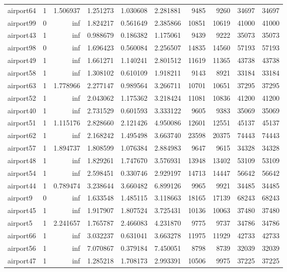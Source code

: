 \begin{longtable}{|l|r|r|r|r|r|r|r|r|r|}
airport64 & 1 & 1.506937 & 1.251273 & 1.030608 & 2.281881 & 9485 & 9260 & 34697 & 34697 \\
airport99 & 0 & inf & 1.824217 & 0.561649 & 2.385866 & 10851 & 10619 & 41000 & 41000 \\
airport43 & 1 & inf & 0.988679 & 0.186382 & 1.175061 & 9439 & 9222 & 35073 & 35073 \\
airport98 & 0 & inf & 1.696423 & 0.560084 & 2.256507 & 14835 & 14560 & 57193 & 57193 \\
airport49 & 1 & inf & 1.661271 & 1.140241 & 2.801512 & 11619 & 11365 & 43738 & 43738 \\
airport58 & 1 & inf & 1.308102 & 0.610109 & 1.918211 & 9143 & 8921 & 33184 & 33184 \\
airport63 & 1 & 1.778966 & 2.277147 & 0.989564 & 3.266711 & 10701 & 10651 & 37295 & 37295 \\
airport52 & 1 & inf & 2.043062 & 1.175362 & 3.218424 & 11081 & 10836 & 41200 & 41200 \\
airport40 & 1 & inf & 2.731529 & 0.601593 & 3.333122 & 9605 & 9383 & 35069 & 35069 \\
airport51 & 1 & 1.115176 & 2.828660 & 2.121426 & 4.950086 & 12601 & 12551 & 45137 & 45137 \\
airport62 & 1 & inf & 2.168242 & 1.495498 & 3.663740 & 23598 & 20375 & 74443 & 74443 \\
airport57 & 1 & 1.894737 & 1.808599 & 1.076384 & 2.884983 & 9647 & 9615 & 34328 & 34328 \\
airport48 & 1 & inf & 1.829261 & 1.747670 & 3.576931 & 13948 & 13402 & 53109 & 53109 \\
airport54 & 1 & inf & 2.598451 & 0.330746 & 2.929197 & 14713 & 14447 & 56642 & 56642 \\
airport44 & 1 & 0.789474 & 3.238644 & 3.660482 & 6.899126 & 9965 & 9921 & 34485 & 34485 \\
airport9 & 0 & inf & 1.633548 & 1.485115 & 3.118663 & 18165 & 17139 & 68243 & 68243 \\
airport45 & 1 & inf & 1.917907 & 1.807524 & 3.725431 & 10136 & 10063 & 37480 & 37480 \\
airport5 & 1 & 2.241657 & 1.765787 & 2.466083 & 4.231870 & 9775 & 9737 & 34786 & 34786 \\
airport66 & 1 & inf & 3.032237 & 0.631041 & 3.663278 & 11975 & 11929 & 42733 & 42733 \\
airport56 & 1 & inf & 7.070867 & 0.379184 & 7.450051 & 8798 & 8739 & 32039 & 32039 \\
airport47 & 1 & inf & 1.285218 & 1.708173 & 2.993391 & 10506 & 9975 & 37225 & 37225 \\

\end{longtable}
